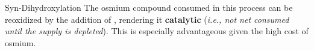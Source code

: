 \documentclass[10pt]{article}
\begin{document}
\begin{core}[label=core:osmium_hydrox]{ Syn-Dihydroxylation}
        The osmium compound consumed in this process can be reoxidized by the addition of , rendering it \textbf{catalytic} (\textit{i.e., not net consumed until the  supply is depleted}). This is especially advantageous given the high cost of osmium.


      \end{core}
\end{document}
